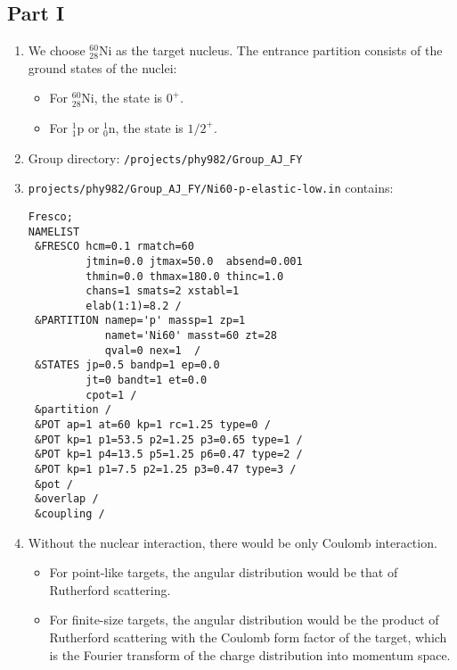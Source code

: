 \documentclass[fleqn, 12pt]{article}
\begin{document}
\subsection*{Part I}

\begin{enumerate}

\item We choose ${}^{60}_{28} \mathrm{Ni}$ as the target nucleus.  The
  entrance partition consists of the ground states of the nuclei:
  \begin{itemize}
  \item For ${}^{60}_{28} \mathrm{Ni}$, the state is $0^+$.
  \item For ${}^{1}_{1} \mathrm{p}$ or ${}^{1}_{0} \mathrm{n}$, the state is
    $1/2^+$.
  \end{itemize}

\item Group directory: \verb|/projects/phy982/Group_AJ_FY|

\item \verb|projects/phy982/Group_AJ_FY/Ni60-p-elastic-low.in| contains:

  \begin{lstlisting}
Fresco;
NAMELIST
 &FRESCO hcm=0.1 rmatch=60
         jtmin=0.0 jtmax=50.0  absend=0.001
         thmin=0.0 thmax=180.0 thinc=1.0
         chans=1 smats=2 xstabl=1
         elab(1:1)=8.2 /
 &PARTITION namep='p' massp=1 zp=1
            namet='Ni60' masst=60 zt=28
            qval=0 nex=1  /
 &STATES jp=0.5 bandp=1 ep=0.0
         jt=0 bandt=1 et=0.0
         cpot=1 /
 &partition /
 &POT ap=1 at=60 kp=1 rc=1.25 type=0 /
 &POT kp=1 p1=53.5 p2=1.25 p3=0.65 type=1 /
 &POT kp=1 p4=13.5 p5=1.25 p6=0.47 type=2 /
 &POT kp=1 p1=7.5 p2=1.25 p3=0.47 type=3 /
 &pot /
 &overlap /
 &coupling /
  \end{lstlisting}

\item Without the nuclear interaction, there would be only Coulomb
  interaction.

  \begin{itemize}
  \item For point-like targets, the angular distribution would be
    that of Rutherford scattering.
  \item For finite-size targets, the angular distribution would be the product
    of Rutherford scattering with the Coulomb form factor of the target, which
    is the Fourier transform of the charge distribution into momentum space.
  \end{itemize}


\end{enumerate}
\end{document}
